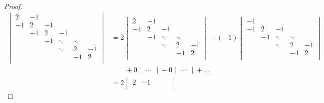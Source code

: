 \documentclass[12pt,letterpaper]{article}
\begin{document}
\begin{enumerate}
\begin{proof}
        \begin{align*}
          \begin{vmatrix}
            2  & -1 &        &        &        &        \\
            -1 & 2  & -1     &        &        &        \\
               & -1 & 2      & -1     &        &        \\
               &    & -1     & \ddots & \ddots &        \\
               &    &        & \ddots & 2      & -1     \\
               &    &        &        & -1     & 2      \\
          \end{vmatrix}
          &= 2
            \begin{vmatrix}
              2  & -1     &        &        &        \\
              -1 & 2      & -1     &        &        \\
                 & -1     & \ddots & \ddots &        \\
                 &        & \ddots & 2      & -1     \\
                 &        &        & -1     & 2      \\
            \end{vmatrix}
            - (-1)
            \begin{vmatrix}
              -1 &        &        &        &        \\
              -1 & 2      & -1     &        &        \\
                 & -1     & \ddots & \ddots &        \\
                 &        & \ddots & 2      & -1     \\
                 &        &        & -1     & 2      \\
            \end{vmatrix} \\
          & \qquad + 0 \begin{vmatrix}\dots\end{vmatrix}
            - 0 \begin{vmatrix}\dots\end{vmatrix}
            + \dots \\
          &= 2
            \begin{vmatrix}
              2  & -1     &        &        &        \\

\end{vmatrix}
\end{align*}
\end{proof}
\end{enumerate}
\end{document}
